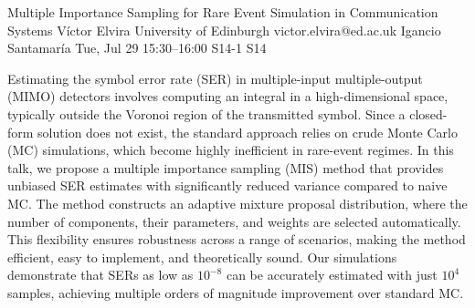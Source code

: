 \begin{talk}
  {Multiple Importance Sampling for Rare Event Simulation in Communication Systems}%
  {V\'ictor Elvira}%
  {University of Edinburgh}%
  {victor.elvira@ed.ac.uk}%
  {Igancio Santamar\'ia}%
  {}%
  {Tue, Jul 29 15:30–16:00}%
  {S14-1}%
  {S14}%
  
				
			
Estimating the symbol error rate (SER) in multiple-input multiple-output (MIMO) detectors involves computing an integral in a high-dimensional space, typically outside the Voronoi region of the transmitted symbol. Since a closed-form solution does not exist, the standard approach relies on crude Monte Carlo (MC) simulations, which become highly inefficient in rare-event regimes.  In this talk, we propose a multiple importance sampling (MIS) method that provides unbiased SER estimates with significantly reduced variance compared to naive MC. The method constructs an adaptive mixture proposal distribution, where the number of components, their parameters, and weights are selected automatically. This flexibility ensures robustness across a range of scenarios, making the method efficient, easy to implement, and theoretically sound. Our simulations demonstrate that SERs as low as $10^{-8}$ can be accurately estimated with just $10^4$ samples, achieving multiple orders of magnitude improvement over standard MC.
\medskip


\end{talk}

